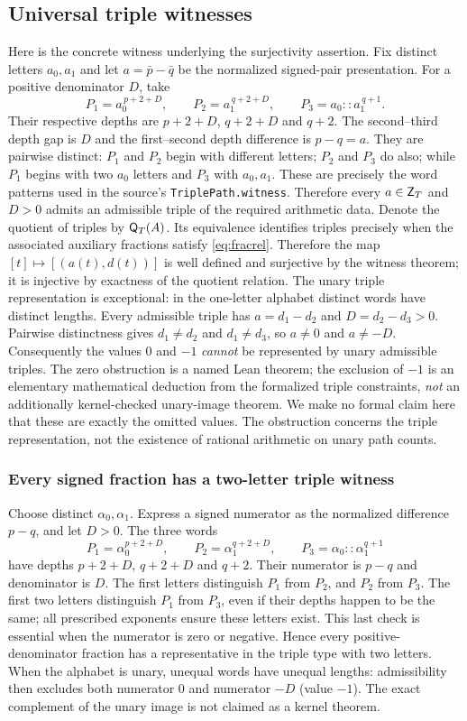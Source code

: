 \documentclass[11pt,reqno]{amsart}
\theoremstyle{definition}\newtheorem{definition}[theorem]{Definition}
\theoremstyle{remark}\newtheorem{remark}[theorem]{Remark}
\begin{document}
\subsection{Universal triple witnesses}\label{main:sub-17}
Here is the concrete witness underlying the surjectivity assertion. Fix distinct letters $a_0,a_1$ and let $a=\bar p-\bar q$ be the normalized signed-pair presentation. For a positive denominator $D$, take
\[
P_1=a_0^{\,p+2+D},\qquad
P_2=a_1^{\,q+2+D},\qquad
P_3=a_0::a_1^{\,q+1}.
\]
Their respective depths are $p+2+D$, $q+2+D$ and $q+2$. The second--third depth gap is $D$ and the first--second depth difference is $p-q=a$. They are pairwise distinct: $P_1$ and $P_2$ begin with different letters; $P_2$ and $P_3$ do also; while $P_1$ begins with two $a_0$ letters and $P_3$ with $a_0,a_1$. These are precisely the word patterns used in the source's \texttt{TriplePath.witness}. Therefore every $a\in\mathsf Z_T$ and $D>0$ admits an admissible triple of the required arithmetic data. Denote the quotient of triples by $\mathsf Q_T(A)$. Its equivalence identifies triples precisely when the associated auxiliary fractions satisfy \eqref{eq:fracrel}. Therefore the map $[t]\mapsto[(a(t),d(t))]$ is well defined and surjective by the witness theorem; it is injective by exactness of the quotient relation. The unary triple representation is exceptional: in the one-letter alphabet distinct words have distinct lengths. Every admissible triple has $a=d_1-d_2$ and $D=d_2-d_3>0$. Pairwise distinctness gives $d_1\ne d_2$ and $d_1\ne d_3$, so $a\ne0$ and $a\ne-D$. Consequently the values $0$ and $-1$ \emph{cannot} be represented by unary admissible triples. The zero obstruction is a named Lean theorem; the exclusion of $-1$ is an elementary mathematical deduction from the formalized triple constraints, \emph{not} an additionally kernel-checked unary-image theorem. We make no formal claim here that these are exactly the omitted values. The obstruction concerns the triple representation, not the existence of rational arithmetic on unary path counts.


\medskip
\subsubsection*{Every signed fraction has a two-letter triple witness}\label{supp:6-3}
Choose distinct $\alpha_0,\alpha_1$. Express a signed numerator as the normalized difference $p-q$, and let $D>0$. The three words
\[
 P_1=\alpha_0^{p+2+D},\qquad
 P_2=\alpha_1^{q+2+D},\qquad
 P_3=\alpha_0::\alpha_1^{q+1}
\]
have depths $p+2+D$, $q+2+D$ and $q+2$. Their numerator is $p-q$ and denominator is $D$. The first letters distinguish $P_1$ from $P_2$, and $P_2$ from $P_3$. The first two letters distinguish $P_1$ from $P_3$, even if their depths happen to be the same; all prescribed exponents ensure these letters exist. This last check is essential when the numerator is zero or negative. Hence every positive-denominator fraction has a representative in the triple type with two letters. When the alphabet is unary, unequal words have unequal lengths: admissibility then excludes both numerator $0$ and numerator $-D$ (value $-1$). The exact complement of the unary image is not claimed as a kernel theorem.
\medskip
\medskip
\end{document}
